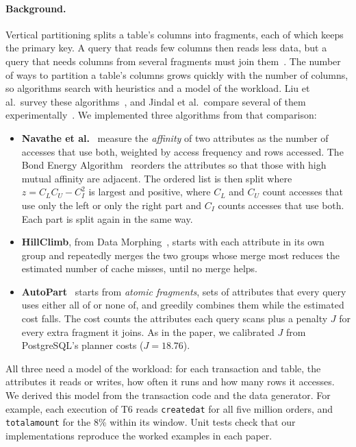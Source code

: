 \documentclass[sigconf,10pt,nonacm]{acmart}
\renewcommand{\_}{\underscorewithoutbreak\allowbreak}
\begin{document}
\paragraph{Background.} Vertical partitioning splits a table's columns into fragments,
each of which keeps the primary key. A query that reads few columns then reads less
data, but a query that needs columns from several fragments must join
them~\cite{ozsu2020, rahimi2010}. The number of ways to partition a table's columns
grows quickly with the number of columns, so algorithms search with heuristics and a
model of the workload. Liu et al.\ survey these algorithms~\cite{liu2024survey}, and
Jindal et al.\ compare several of them experimentally~\cite{jindal2013}. We implemented
three algorithms from that comparison:
\begin{itemize}
\item \textbf{Navathe et al.}~\cite{navathe1984} measure the \emph{affinity} of two
attributes as the number of accesses that use both, weighted by access frequency and
rows accessed. The Bond Energy Algorithm~\cite{mccormick1972} reorders the attributes
so that those with high mutual affinity are adjacent. The ordered list is then split
where $z = C_L C_U - C_I^2$ is largest and positive, where $C_L$ and $C_U$ count
accesses that use only the left or only the right part and $C_I$ counts accesses that
use both. Each part is split again in the same way.
\item \textbf{HillClimb}, from Data Morphing~\cite{hankins2003}, starts with each
attribute in its own group and repeatedly merges the two groups whose merge most
reduces the estimated number of cache misses, until no merge helps.
\item \textbf{AutoPart}~\cite{papadomanolakis2004} starts from \emph{atomic
fragments}, sets of attributes that every query uses either all of or none of, and
greedily combines them while the estimated cost falls. The cost counts the attributes
each query scans plus a penalty $J$ for every extra fragment it joins. As in the
paper, we calibrated $J$ from PostgreSQL's planner costs ($J = 18.76$).
\end{itemize}
All three need a model of the workload: for each transaction and table, the attributes
it reads or writes, how often it runs and how many rows it accesses. We derived this
model from the transaction code and the data generator. For example, each execution of
T6 reads \texttt{created\_at} for all five million orders, and \texttt{total\_amount}
for the 8\% within its window. Unit tests check that our implementations reproduce the
worked examples in each paper.
\end{document}
